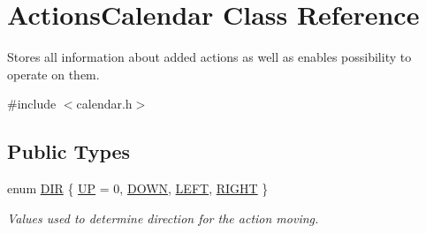\hypertarget{class_actions_calendar}{\section{Actions\-Calendar Class Reference}
\label{class_actions_calendar}
}


Stores all information about added actions as well as enables possibility to operate on them.  




{\ttfamily \#include $<$calendar.\-h$>$}

\subsection*{Public Types}
\begin{DoxyCompactItemize}
\item 
enum \hyperlink{class_actions_calendar_a8cb1843b3b3a5b8554bbeb512f50b590}{D\-I\-R} \{ \hyperlink{class_actions_calendar_a8cb1843b3b3a5b8554bbeb512f50b590a49d47d7ac31d02ee24068959caa6c7fc}{U\-P} =  0, 
\hyperlink{class_actions_calendar_a8cb1843b3b3a5b8554bbeb512f50b590ad0e20aae882c4df912f5d43aa5898f45}{D\-O\-W\-N}, 
\hyperlink{class_actions_calendar_a8cb1843b3b3a5b8554bbeb512f50b590ad5ac1c3768ea4c94013035ab481be7f3}{L\-E\-F\-T}, 
\hyperlink{class_actions_calendar_a8cb1843b3b3a5b8554bbeb512f50b590a4294fe73b009b4134aa7675eeb7ec9c7}{R\-I\-G\-H\-T}
 \}
\begin{DoxyCompactList}\small\item\em Values used to determine direction for the action moving. \end{DoxyCompactList}\end{DoxyCompactItemize}
